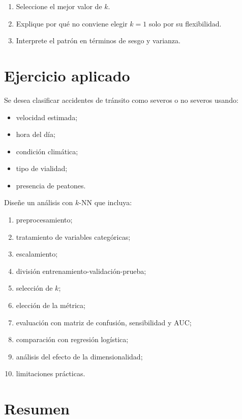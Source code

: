 \documentclass[
  spanish,
  11pt,
  letterpaper,
  DIV=11,
  numbers=noendperiod]{scrreprt}
\providecommand{\tightlist}{%
  \setlength{\itemsep}{0pt}\setlength{\parskip}{0pt}}
\theoremstyle{definition}
\theoremstyle{plain}
\theoremstyle{definition}
\theoremstyle{remark}
\begin{document}
\begin{enumerate}
\def\labelenumi{\arabic{enumi}.}
\tightlist
\item
  Seleccione el mejor valor de \(k\).
\item
  Explique por qué no conviene elegir \(k=1\) solo por su flexibilidad.
\item
  Interprete el patrón en términos de sesgo y varianza.
\end{enumerate}

\section{Ejercicio aplicado}\label{ejercicio-aplicado-9}

Se desea clasificar accidentes de tránsito como severos o no severos
usando:

\begin{itemize}
\tightlist
\item
  velocidad estimada;
\item
  hora del día;
\item
  condición climática;
\item
  tipo de vialidad;
\item
  presencia de peatones.
\end{itemize}

Diseñe un análisis con \(k\)-NN que incluya:

\begin{enumerate}
\def\labelenumi{\arabic{enumi}.}
\tightlist
\item
  preprocesamiento;
\item
  tratamiento de variables categóricas;
\item
  escalamiento;
\item
  división entrenamiento-validación-prueba;
\item
  selección de \(k\);
\item
  elección de la métrica;
\item
  evaluación con matriz de confusión, sensibilidad y AUC;
\item
  comparación con regresión logística;
\item
  análisis del efecto de la dimensionalidad;
\item
  limitaciones prácticas.
\end{enumerate}

\section{Resumen}\label{resumen-11}
\end{document}
